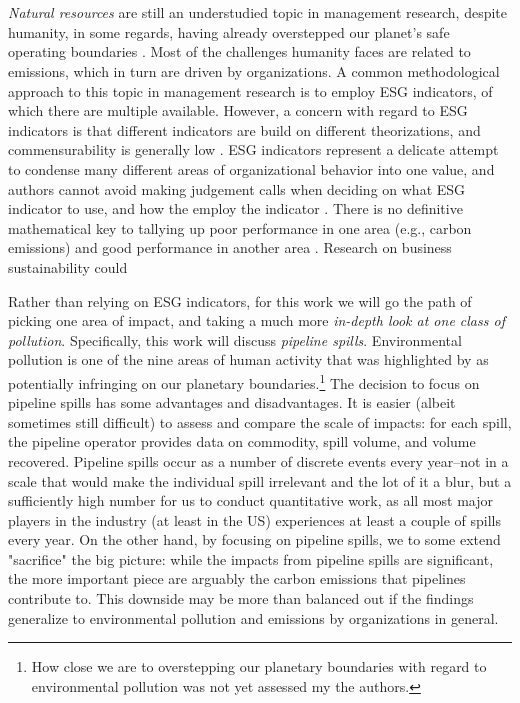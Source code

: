 \section{}

\textit{Natural resources} are still an understudied topic in management research, despite humanity, in some regards, having already overstepped our planet's safe operating boundaries \citep{George2015, Rockstrom2009a}. Most of the challenges humanity faces are related to emissions, which in turn are driven by organizations. A common methodological approach to this topic in management research is to employ ESG indicators, of which there are multiple available. However, a concern with regard to ESG indicators is that different indicators are build on different theorizations, and commensurability is generally low \citep{Chatterji2016}. ESG indicators represent a delicate attempt to condense many different areas of organizational behavior into one value, and authors cannot avoid making judgement calls when deciding on what ESG indicator to use, and how the employ the indicator \citep{Eccles2019}. There is no definitive mathematical key to tallying up poor performance in one area (e.g., carbon emissions) and good performance in another area \citep[e.g., working conditions;][]{Constanza2014}. Research on business sustainability could 

Rather than relying on ESG indicators, for this work we will go the path of picking one area of impact, and taking a much more \textit{in-depth look at one class of pollution}. Specifically, this work will discuss \textit{pipeline spills}. Environmental pollution is one of the nine areas of human activity that was highlighted by \citet{Rockstrom2009} as potentially infringing on our planetary boundaries.\footnote{How close we are to overstepping our planetary boundaries with regard to environmental pollution was not yet assessed my the authors.} The decision to focus on pipeline spills has some advantages and disadvantages. It is easier (albeit sometimes still difficult) to assess and compare the scale of impacts: for each spill, the pipeline operator provides data on commodity, spill volume, and volume recovered. Pipeline spills occur as a number of discrete events every year--not in a scale that would make the individual spill irrelevant and the lot of it a blur, but a sufficiently high number for us to conduct quantitative work, as all most major players in the industry (at least in the US) experiences at least a couple of spills every year. On the other hand, by focusing on pipeline spills, we to some extend "sacrifice" the big picture: while the impacts from pipeline spills are significant, the more important piece are arguably the carbon emissions that pipelines contribute to. This downside may be more than balanced out if the findings generalize to environmental pollution and emissions by organizations in general.

